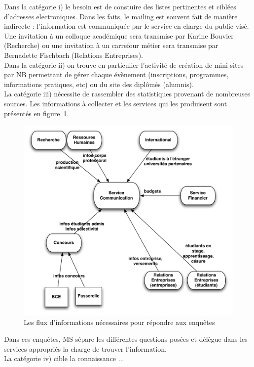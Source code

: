 \documentclass{book}
\begin{document}
Dans la catégorie i) le besoin est de constuire des listes pertinentes 
et ciblées d'adresses electroniques. Dans les faits, le mailing est
souvent fait de manière indirecte : l'information est communiquée par
le service en charge du public visé. Une invitation à un colloque académique
sera transmise par Karine Bouvier (Recherche) ou une invitation à un
carrefour métier sera transmise par Bernadette Fischbach (Relations Entreprises).\\

Dans la catégorie ii) on trouve en particulier l'activité de création
de mini-sites par NB permettant de gérer chaque évènement (inscriptions,
programmes, informations pratiques, etc) ou du site des diplômés (alumnis).\\


La catégorie iii) nécessite de rassembler des statistiques provenant de 
nombreuses sources. Les informations à collecter et les services qui les 
produisent sont présentés en figure~\ref{fg:comm_flux}.
\begin{figure}[hbt]
\begin{center}
\includegraphics[width=.75\linewidth]{figs/comm_flux.pdf}
\end{center}
\label{fg:comm_flux}
\caption{Les flux d'informations nécessaires pour répondre aux enquêtes}
\end{figure}
Dans ces enquêtes, MS sépare les différentes questions posées et délègue
dans les services appropriés la charge de trouver l'information.\\


La catégorie iv) cible la connaissance  ...
\end{document}
